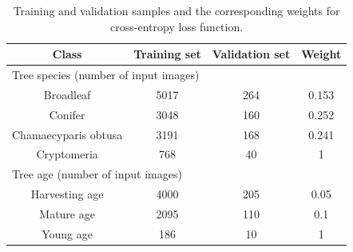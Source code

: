 \begin{table}[tbh!]
    \centering
    \caption[Samples, weights for cross-entropy loss training]{Training and validation samples and the corresponding weights for cross-entropy loss function.}
    \begin{tabular}{c c c c}
    \hline
        Class   & Training set  & Validation set & Weight \\ \hline
        \multicolumn{4}{l}{Tree species (number of input images)} \\ \hline
        Broadleaf   & 5017  & 264  & 0.153 \\ 
        Conifer  & 3048  & 160  & 0.252  \\ 
        Chamaecyparis obtusa   & 3191  & 168  & 0.241 \\ 
        Cryptomeria  & 768  & 40  & 1 \\ \hline
        \multicolumn{4}{l}{Tree age (number of input images)} \\ \hline
        Harvesting age   & 4000  & 205  & 0.05 \\ 
        Mature age  & 2095  & 110  & 0.1  \\ 
        Young age   & 186  & 10 & 1 \\ \hline
    \end{tabular}
    \label{tab:chap5_tab1}
\end{table}

